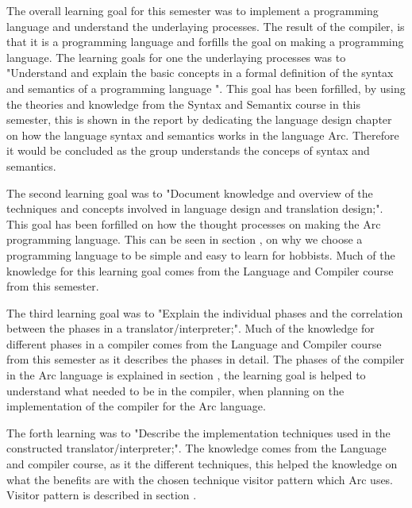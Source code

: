 The overall learning goal for this semester was to implement a programming language and understand the underlaying processes. The result of the compiler, is that it is a programming language and forfills the goal on making a programming language. The learning goals for one the underlaying processes was to "Understand and explain the basic concepts in a formal definition of the syntax and semantics of a programming language ". This goal has been forfilled, by using the theories and knowledge from the Syntax and Semantix course in this semester, this is shown in the report by dedicating the language design chapter on how the language syntax and semantics works in the language Arc. Therefore it would be concluded as the group understands the conceps of syntax and semantics.

The second learning goal was to "Document knowledge and overview of the techniques and concepts involved in language design and translation design;". This goal has been forfilled on how the thought processes on making the Arc programming language. This can be seen in section , on why we choose a programming language to be simple and easy to learn for hobbists. Much of the knowledge for this learning goal comes from the Language and Compiler course from this semester. 
 
The third learning goal was to "Explain the individual phases and the correlation between the phases in a translator/interpreter;". Much of the knowledge for different phases in a compiler comes from the Language and Compiler course from this semester as it describes the phases in detail. The phases of the compiler in the Arc language is explained in section , the learning goal is helped to understand what needed to be in the compiler, when planning on the implementation of the compiler for the Arc language. 
 
The forth learning was to "Describe the implementation techniques used in the constructed translator/interpreter;". The knowledge comes from the Language and compiler course, as it the different techniques, this helped the knowledge on what the benefits are with the chosen technique visitor pattern which Arc uses. Visitor pattern is described in section . 
